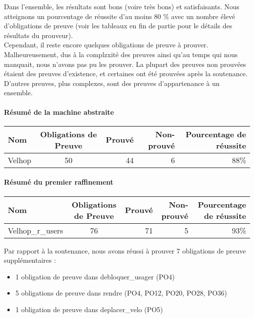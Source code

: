 \documentclass[12pt]{article}
\begin{document}
Dans l'ensemble, les résultats sont bons (voire très bons) et satisfaisants. Nous atteignons un pourcentage de réussite d'au moins 80 \% avec un nombre élevé d'obligations de preuve (voir les tableaux en fin de partie pour le détails des résultats du prouveur).\\

Cependant, il reste encore quelques obligations de preuve à prouver. Malheureusement, dus à la complzxité des preuves ainsi qu'au temps qui nous manquait, nous n'avons pas pu les prouver. La plupart des preuves non prouvées étaient des preuves d'existence, et certaines ont été prouvées après la soutenance. D'autres preuves, plus complexes, sont des preuves d'appartenance à un ensemble.
\paragraph{Résumé de la machine abstraite}
\begin{center}
	\begin{tabular}{| l | c | r | r| r |}
		\hline
		Nom & Obligations de Preuve & Prouvé & Non-prouvé & Pourcentage de réussite \\ \hline
		Velhop & 50 & 44 & 6 & 88\% \\ \hline
	\end{tabular}
\end{center}

\paragraph{Résumé du premier raffinement}
\begin{center}
	\begin{tabular}{| l | c | r | r|r|}
		\hline
    Nom & Obligations de Preuve & Prouvé & Non-prouvé & Pourcentage de réussite\\ \hline
    Velhop\_r\_users & 76 & 71 & 5 & 93\% \\ \hline
	\end{tabular}
\end{center}

Par rapport à la soutenance, nous avons réussi à prouver 7 obligations de preuve supplémentaires :
\begin{itemize}
  \item 1 obligation de preuve dans debloquer\_usager (PO4)
  \item 5 obligations de preuve dans rendre (PO4, PO12, PO20, PO28, PO36)
  \item 1 obligation de preuve dans deplacer\_velo (PO5)
\end{itemize}
\end{document}
